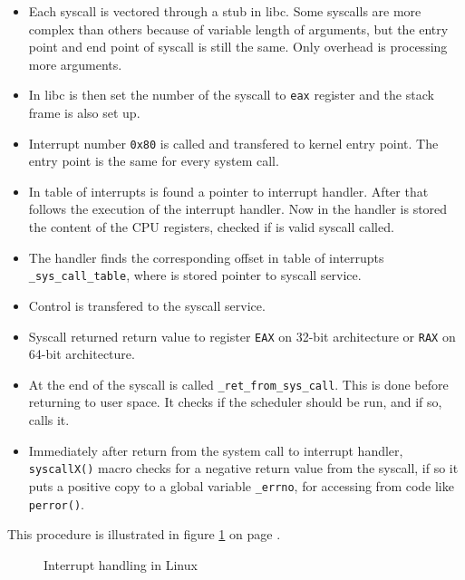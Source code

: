 \begin{itemize}
	\item Each syscall is vectored through a stub in libc. Some syscalls are more complex than others because of variable length of arguments, but the entry point and end point of syscall is still the same. Only overhead is processing more arguments.
	\item In libc is then set the number of the syscall to \texttt{eax} register and the stack frame is also set up.
	\item Interrupt number \texttt{0x80} is called and transfered to kernel entry point. The entry point is the same for every system call.
	\item In table of interrupts is found a pointer to interrupt handler. After that follows the execution of the interrupt handler. Now in the handler is stored the content of the CPU registers, checked if is valid syscall called.
	\item The handler finds the corresponding offset in table of interrupts \texttt{\_sys\_call\_table}, where is stored pointer to syscall service.
	\item Control is transfered to the syscall service.
	\item Syscall returned return value to register \texttt{EAX} on 32-bit architecture or \texttt{RAX} on 64-bit architecture.
	\item At the end of the syscall is called \texttt{\_ret\_from\_sys\_call\(\)}. This is done before returning to user space. It checks if the scheduler should be run, and if so, calls it.
	\item Immediately after return from the system call to interrupt handler, \texttt{syscallX()} macro checks for a negative return value from the syscall, if so it puts a positive copy to a global variable \texttt{\_errno}, for accessing from code like \texttt{perror()}.
\end{itemize}

This procedure is illustrated in figure \ref{fig:tikz:int_handling} on page \pageref{fig:tikz:int_handling}.

\begin{figure}[]
  \centering
  
  \caption{Interrupt handling in Linux}
  \label{fig:tikz:int_handling}
\end{figure}


% 

